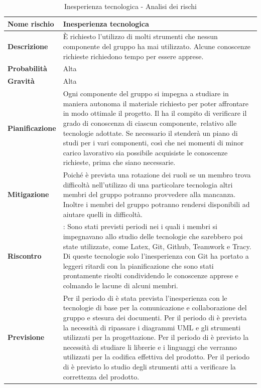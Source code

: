 \documentclass[12pt,a4paper]{article}
\begin{document}
\begin{table}[H]
	\begin{center}
		\begin{tabular}{p{} p{}}
			\toprule
			\textbf{Nome rischio} & \textbf{Inesperienza tecnologica} \\
			\midrule
			\midrule
			\textbf{Descrizione} & È richiesto l’utilizzo di molti strumenti \mgls{software} che nessun componente del gruppo ha mai utilizzato. Alcune conoscenze richieste richiedono tempo per
			essere apprese. \\
			\midrule
			\textbf{Probabilità} & Alta \\
			\midrule
			\textbf{Gravità} & Alta \\
			\midrule
			\textbf{Pianificazione} & Ogni componente del gruppo si impegna a studiare in maniera autonoma il materiale richiesto per poter affrontare in modo ottimale il progetto. Il \PM{} ha il compito di verificare il grado di conoscenza di ciascun componente, relativo alle tecnologie adottate. Se necessario il \PM{} stenderà un piano di studi per i vari componenti, così che nei momenti di minor carico lavorativo sia possibile acquisiste le conoscenze richieste, prima che siano necessarie. \\
			\midrule
			\textbf{Mitigazione} & Poiché è prevista una rotazione dei ruoli se un membro trova difficoltà nell'utilizzo di una particolare tecnologia altri membri del gruppo potranno provvedere alla mancanza. Inoltre i membri del gruppo potranno rendersi disponibili ad aiutare quelli in difficoltà. \\
			\midrule
            \textbf{Riscontro} & \textbf{\FA{}}: Sono stati previsti periodi nei i quali i membri si impegnavano allo studio delle tecnologie che sarebbero poi state utilizzate, come Latex, Git, Github, Teamwork e Tracy. Di queste tecnologie solo l'inesperienza con Git ha portato a leggeri ritardi con la pianificazione che sono stati prontamente risolti condividendo le conoscenze apprese e colmando le lacune di alcuni membri. \\
    		\midrule
            \textbf{Previsione} & Per il periodo di \FA{} è stata prevista l'inesperienza con le tecnologie di base per la comunicazione e collaborazione del gruppo e stesura dei documenti. Per il periodo di \FPA{} è prevista la necessità di ripassare i diagrammi UML e gli strumenti utilizzati per la progettazione. Per il periodo di \FPDC{} è previsto la necessità di studiare li librerie e i linguaggi che verranno utilizzati per la codifica effettiva del prodotto. Per il periodo di \FVV{} è previsto lo studio degli strumenti atti a verificare la correttezza del prodotto. \\
			\bottomrule
		\end{tabular}
		\caption{Inesperienza tecnologica - Analisi dei rischi}
	\end{center}
\end{table}
\end{document}
